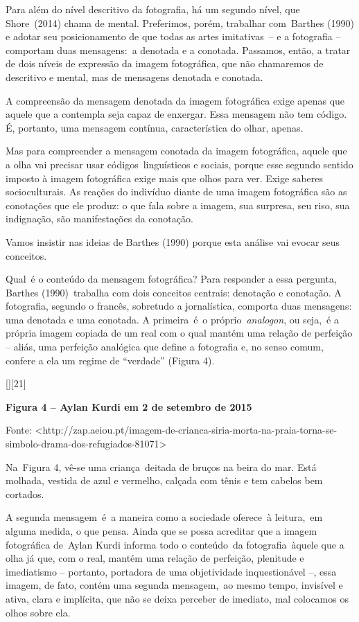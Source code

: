 \documentclass[
  letterpaper,
  a4paper,
  12pt]{scrbook}
\begin{document}
Para além do nível descritivo da fotografia, há um segundo nível, que
Shore~(2014) chama de mental. Preferimos, porém, trabalhar com~Barthes
(1990) e adotar seu posicionamento de que todas as artes imitativas~-- e
a fotografia -- comportam duas mensagens:~a denotada e a conotada.
Passamos, então, a tratar de dois níveis de expressão da imagem
fotográfica, que não chamaremos de descritivo e mental, mas de mensagens
denotada e conotada.~

A compreensão da mensagem denotada da imagem fotográfica exige apenas
que aquele que a contempla seja capaz de enxergar. Essa mensagem não tem
código. É, portanto, uma mensagem contínua, característica do olhar,
apenas.~

Mas para compreender a mensagem conotada da imagem fotográfica, aquele
que a olha vai precisar usar códigos~linguísticos e sociais, porque esse
segundo sentido imposto à imagem fotográfica exige mais que olhos para
ver. Exige saberes socioculturais. As reações do indivíduo diante de uma
imagem fotográfica são as conotações que ele produz: o que fala sobre a
imagem, sua surpresa, seu riso, sua indignação, são manifestações da
conotação.~

Vamos insistir nas ideias de Barthes (1990) porque esta análise vai
evocar seus conceitos.~

Qual~é o conteúdo da mensagem fotográfica? Para responder a essa
pergunta, Barthes (1990)~trabalha com dois conceitos centrais: denotação
e conotação. A fotografia, segundo o francês, sobretudo a jornalística,
comporta duas mensagens: uma denotada e uma conotada. A primeira~é~o
próprio~\emph{analogon}, ou seja,~é a própria imagem copiada de um real
com o qual mantém uma relação de perfeição -- aliás, uma perfeição
analógica que define a fotografia e, no senso comum, confere a ela um
regime de ``verdade'' (Figura 4).~ ~

{[}{]}{[}21{]}~

\protect\hypertarget{_Ref503519869}{}{}\textbf{Figura 4 -- Aylan Kurdi
em 2 de setembro de 2015}

Fonte:
\textless http://zap.aeiou.pt/imagem-de-crianca-siria-morta-na-praia-torna-se-simbolo-drama-dos-refugiados-81071\textgreater~
~

Na~Figura 4, vê-se uma criança~deitada de bruços na beira do mar. Está
molhada, vestida de azul e vermelho, calçada com tênis e tem cabelos bem
cortados.~

A segunda mensagem~é~a maneira como a sociedade oferece~à leitura,~em
alguma medida, o que pensa. Ainda que se possa acreditar que a imagem
fotográfica de~Aylan Kurdi informa todo o conteúdo~da fotografia~àquele
que a olha já que, com o real, mantém uma relação de perfeição,
plenitude e imediatismo -- portanto, portadora de uma objetividade
inquestionável --, essa imagem, de fato, contém uma segunda mensagem,~ao
mesmo tempo, invisível e ativa, clara e implícita, que não se deixa
perceber de imediato, mal colocamos os olhos sobre ela.
\end{document}
